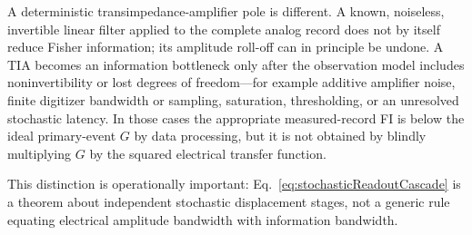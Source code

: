 A deterministic transimpedance-amplifier pole is different. A known, noiseless, invertible linear filter applied to the complete analog record does not by itself reduce Fisher information; its amplitude roll-off can in principle be undone. A TIA becomes an information bottleneck only after the observation model includes noninvertibility or lost degrees of freedom---for example additive amplifier noise, finite digitizer bandwidth or sampling, saturation, thresholding, or an unresolved stochastic latency. In those cases the appropriate measured-record FI is below the ideal primary-event $G$ by data processing, but it is not obtained by blindly multiplying $G$ by the squared electrical transfer function.

This distinction is operationally important: Eq.~\eqref{eq:stochasticReadoutCascade} is a theorem about independent stochastic displacement stages, not a generic rule equating electrical amplitude bandwidth with information bandwidth.
